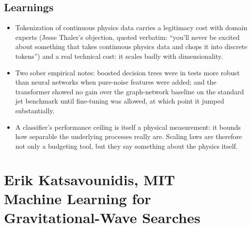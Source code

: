 \documentclass[11pt]{article}
\begin{document}
\subsection*{Learnings}
\begin{itemize}
    \item Tokenization of continuous physics data carries a legitimacy cost with domain experts (Jesse Thaler's objection, quoted verbatim: ``you'll never be excited about something that takes continuous physics data and chops it into discrete tokens'') and a real technical cost: it scales badly with dimensionality.
    \item Two sober empirical notes: boosted decision trees were in tests more robust than neural networks when pure-noise features were added; and the transformer showed no gain over the graph-network baseline on the standard jet benchmark until fine-tuning was allowed, at which point it jumped substantially.
    \item A classifier's performance ceiling is itself a physical measurement: it bounds how separable the underlying processes really are. Scaling laws are therefore not only a budgeting tool, but they say something about the physics itself.
\end{itemize}

\section{Erik Katsavounidis, MIT\\
Machine Learning for Gravitational-Wave Searches}
\end{document}
